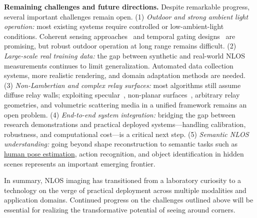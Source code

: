 \textbf{Remaining challenges and future directions.}
Despite remarkable progress, several important challenges remain open. (1) \textit{Outdoor and strong ambient light operation:} most existing systems require controlled or low-ambient-light conditions. Coherent sensing approaches~\cite{huangCoherentNLOS2024} and temporal gating designs~\cite{riccardoFastGatedSPAD2022} are promising, but robust outdoor operation at long range remains difficult. (2) \textit{Large-scale real training data:} the gap between synthetic and real-world NLOS measurements continues to limit generalization. Automated data collection systems, more realistic rendering, and domain adaptation methods are needed. (3) \textit{Non-Lambertian and complex relay surfaces:} most algorithms still assume diffuse relay walls; exploiting specular~\cite{liRoughSurfaces2025}, non-planar surfaces~\cite{guNonPlanar2023}, arbitrary relay geometries, and volumetric scattering media in a unified framework remains an open problem. (4) \textit{End-to-end system integration:} bridging the gap between research demonstrations and practical deployed systems---handling calibration, robustness, and computational cost---is a critical next step. (5) \textit{Semantic NLOS understanding:} going beyond shape reconstruction to semantic tasks such as \href{https://arxiv.org/abs/2003.14414}{human pose estimation}, action recognition, and object identification in hidden scenes represents an important emerging frontier.

In summary, NLOS imaging has transitioned from a laboratory curiosity to a technology on the verge of practical deployment across multiple modalities and application domains. Continued progress on the challenges outlined above will be essential for realizing the transformative potential of seeing around corners.
